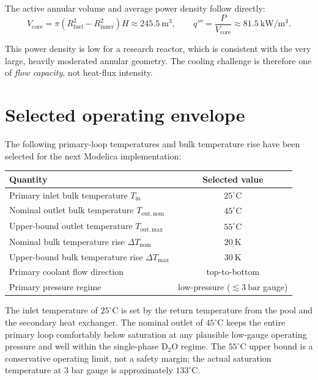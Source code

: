 \documentclass[11pt]{article}
\begin{document}
The active annular volume and average power density follow directly:
\[
V_{\mathrm{core}}
= \pi\!\left(R_{\mathrm{fuel}}^2 - R_{\mathrm{inner}}^2\right) H
\approx 245.5\ \mathrm{m^3},
\qquad
q''' = \frac{P}{V_{\mathrm{core}}} \approx 81.5\ \mathrm{kW/m^3}.
\]

This power density is low for a research reactor, which is consistent with
the very large, heavily moderated annular geometry.  The cooling challenge
is therefore one of \emph{flow capacity}, not heat-flux intensity.

\section{Selected operating envelope}

The following primary-loop temperatures and bulk temperature rise have
been selected for the next Modelica implementation:

\begin{center}
\begin{tabular}{lc}
\hline
Quantity & Selected value \\
\hline
Primary inlet bulk temperature $T_{\mathrm{in}}$ & $25^{\circ}\mathrm{C}$ \\
Nominal outlet bulk temperature $T_{\mathrm{out,nom}}$ & $45^{\circ}\mathrm{C}$ \\
Upper-bound outlet temperature $T_{\mathrm{out,max}}$ & $55^{\circ}\mathrm{C}$ \\
Nominal bulk temperature rise $\Delta T_{\mathrm{nom}}$ & $20\ \mathrm{K}$ \\
Upper-bound bulk temperature rise $\Delta T_{\mathrm{max}}$ & $30\ \mathrm{K}$ \\
Primary coolant flow direction & top-to-bottom \\
Primary pressure regime & low-pressure ($\lesssim 3\ \mathrm{bar}$ gauge) \\
\hline
\end{tabular}
\end{center}

The inlet temperature of $25^{\circ}\mathrm{C}$ is set by the return
temperature from the pool and the secondary heat exchanger.  The nominal
outlet of $45^{\circ}\mathrm{C}$ keeps the entire primary loop
comfortably below saturation at any plausible low-gauge operating
pressure and well within the single-phase D$_2$O regime.  The $55^{\circ}\mathrm{C}$
upper bound is a conservative operating limit, not a safety margin; the
actual saturation temperature at 3 bar gauge is approximately
$133^{\circ}\mathrm{C}$.
\end{document}
